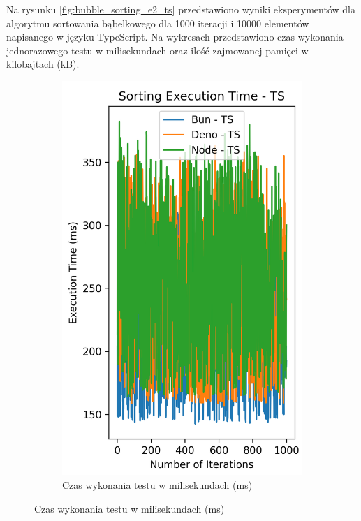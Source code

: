 Na rysunku \ref{fig:bubble_sorting_e2_ts} przedstawiono wyniki eksperymentów dla algorytmu sortowania bąbelkowego dla 1000 iteracji i 10000 elementów napisanego w języku TypeScript. Na wykresach przedstawiono czas wykonania jednorazowego testu w milisekundach oraz ilość zajmowanej pamięci w kilobajtach (kB).

\begin{figure}[H]
  \centering
  \begin{subfigure}[b]{0.42\textwidth}
    \centering
    \includegraphics[width=\textwidth]{Figures/sorting/sorting_bubble_1000_10000_ts_time.png}
    \caption{Czas wykonania testu w milisekundach (ms)}

\end{subfigure}
\end{figure}
